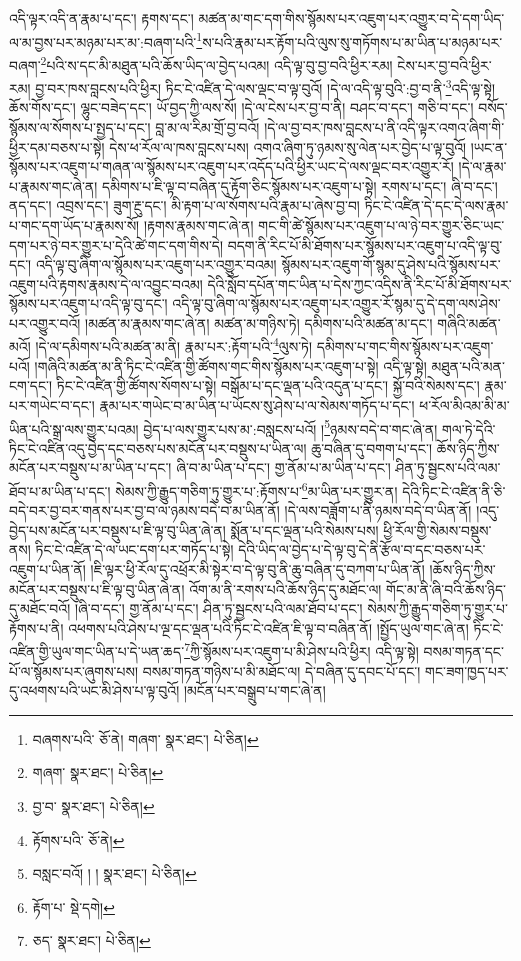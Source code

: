 འདི་ལྟར་འདི་ན་རྣམ་པ་དང་། རྟགས་དང་། མཚན་མ་གང་དག་གིས་སྙོམས་པར་འཇུག་པར་འགྱུར་བ་དེ་དག་ཡིད་ལ་མ་བྱས་པར་མཉམ་པར་མ་:བཞག་པའི་\footnote{བཞགས་པའི་  ཅོ་ནེ། གཞག་  སྣར་ཐང་།  པེ་ཅིན། }ས་པའི་རྣམ་པར་རྟོག་པའི་ལུས་སུ་གཏོགས་པ་མ་ཡིན་པ་མཉམ་པར་བཞག་\footnote{གཞག་  སྣར་ཐང་།  པེ་ཅིན། }པའི་ས་དང་མི་མཐུན་པའི་ཆོས་ཡིད་ལ་བྱེད་པའམ། འདི་ལྟ་བུ་བྱ་བའི་ཕྱིར་རམ། ངེས་པར་བྱ་བའི་ཕྱིར་རམ། བྱ་བར་ཁས་བླངས་པའི་ཕྱིར། ཏིང་ངེ་འཛིན་དེ་ལས་ལྡང་བ་ལྟ་བུའོ། །དེ་ལ་འདི་ལྟ་བུའི་:བྱ་བ་ནི་\footnote{བྱ་བ་  སྣར་ཐང་།  པེ་ཅིན། }འདི་ལྟ་སྟེ། ཆོས་གོས་དང་། ལྷུང་བཟེད་དང་། ཡོ་བྱད་ཀྱི་ལས་སོ། །དེ་ལ་ངེས་པར་བྱ་བ་ནི། བཤང་བ་དང་། གཅི་བ་དང་། བསོད་སྙོམས་ལ་སོགས་པ་སྤྱད་པ་དང་། བླ་མ་ལ་རིམ་གྲོ་བྱ་བའོ། །དེ་ལ་བྱ་བར་ཁས་བླངས་པ་ནི་འདི་ལྟར་འགའ་ཞིག་གི་ཕྱིར་དམ་བཅས་པ་སྟེ། དེས་ཕ་རོལ་ལ་ཁས་བླངས་པས། འགའ་ཞིག་ཏུ་ཉམས་སུ་ལེན་པར་བྱེད་པ་ལྟ་བུའོ། །ཡང་ན་སྙོམས་པར་འཇུག་པ་གཞན་ལ་སྙོམས་པར་འཇུག་པར་འདོད་པའི་ཕྱིར་ཡང་དེ་ལས་ལྡང་བར་འགྱུར་རོ། །དེ་ལ་རྣམ་པ་རྣམས་གང་ཞེ་ན། དམིགས་པ་ཇི་ལྟ་བ་བཞིན་དུ་རྟོག་ཅིང་སྙོམས་པར་འཇུག་པ་སྟེ། རགས་པ་དང་། ཞི་བ་དང་། ནད་དང་། འབྲས་དང་། ཟུག་རྔུ་དང་། མི་རྟག་པ་ལ་སོགས་པའི་རྣམ་པ་ཞེས་བྱ་བ། ཏིང་ངེ་འཛིན་དེ་དང་དེ་ལས་རྣམ་པ་གང་དག་ཡོད་པ་རྣམས་སོ། །རྟགས་རྣམས་གང་ཞེ་ན། གང་གི་ཚེ་སྙོམས་པར་འཇུག་པ་ལ་ཉེ་བར་གྱུར་ཅིང་ཡང་དག་པར་ཉེ་བར་གྱུར་པ་དེའི་ཚེ་གང་དག་གིས་དེ། བདག་ནི་རིང་པོ་མི་ཐོགས་པར་སྙོམས་པར་འཇུག་པ་འདི་ལྟ་བུ་དང་། འདི་ལྟ་བུ་ཞིག་ལ་སྙོམས་པར་འཇུག་པར་འགྱུར་བའམ། སྙོམས་པར་འཇུག་གོ་སྙམ་དུ་ཤེས་པའི་སྙོམས་པར་འཇུག་པའི་རྟགས་རྣམས་དེ་ལ་འབྱུང་བའམ། དེའི་སློབ་དཔོན་གང་ཡིན་པ་དེས་ཀྱང་འདིས་ནི་རིང་པོ་མི་ཐོགས་པར་སྙོམས་པར་འཇུག་པ་འདི་ལྟ་བུ་དང་། འདི་ལྟ་བུ་ཞིག་ལ་སྙོམས་པར་འཇུག་པར་འགྱུར་རོ་སྙམ་དུ་དེ་དག་ལས་ཤེས་པར་འགྱུར་བའོ། །མཚན་མ་རྣམས་གང་ཞེ་ན། མཚན་མ་གཉིས་ཏེ། དམིགས་པའི་མཚན་མ་དང་། གཞིའི་མཚན་མའོ། །དེ་ལ་དམིགས་པའི་མཚན་མ་ནི། རྣམ་པར་:རྟོག་པའི་\footnote{རྟོགས་པའི་  ཅོ་ནེ། }ལུས་ཏེ། དམིགས་པ་གང་གིས་སྙོམས་པར་འཇུག་པའོ། །གཞིའི་མཚན་མ་ནི་ཏིང་ངེ་འཛིན་གྱི་ཚོགས་གང་གིས་སྙོམས་པར་འཇུག་པ་སྟེ། འདི་ལྟ་སྟེ། མཐུན་པའི་མན་ངག་དང་། ཏིང་ངེ་འཛིན་གྱི་ཚོགས་སོགས་པ་སྟེ། བསྒོམ་པ་དང་ལྡན་པའི་འདུན་པ་དང་། སྐྱོ་བའི་སེམས་དང་། རྣམ་པར་གཡེང་བ་དང་། རྣམ་པར་གཡེང་བ་མ་ཡིན་པ་ཡོངས་སུ་ཤེས་པ་ལ་སེམས་གཏོད་པ་དང་། ཕ་རོལ་མིའམ་མི་མ་ཡིན་པའི་སྒྲ་ལས་གྱུར་པའམ། བྱེད་པ་ལས་གྱུར་པས་མ་:བསླངས་པའོ། །\footnote{བསླང་བའོ། ། །  སྣར་ཐང་།  པེ་ཅིན། }ཉམས་བདེ་བ་གང་ཞེ་ན། གལ་ཏེ་དེའི་ཏིང་ངེ་འཛིན་འདུ་བྱེད་དང་བཅས་པས་མངོན་པར་བསྡུས་པ་ཡིན་ལ། ཆུ་བཞིན་དུ་བགག་པ་དང་། ཆོས་ཉིད་ཀྱིས་མངོན་པར་བསྡུས་པ་མ་ཡིན་པ་དང་། ཞི་བ་མ་ཡིན་པ་དང་། གྱ་ནོམ་པ་མ་ཡིན་པ་དང་། ཤིན་ཏུ་སྦྱངས་པའི་ལམ་ཐོབ་པ་མ་ཡིན་པ་དང་། སེམས་ཀྱི་རྒྱུད་གཅིག་ཏུ་གྱུར་པ་:རྟོགས་པ་\footnote{རྟོག་པ་  སྡེ་དགེ། }མ་ཡིན་པར་གྱུར་ན། དེའི་ཏིང་ངེ་འཛིན་ནི་ཅི་བདེ་བར་བྱ་བར་གནས་པར་བྱ་བ་ལ་ཉམས་བདེ་བ་མ་ཡིན་ནོ། །དེ་ལས་བཟློག་པ་ནི་ཉམས་བདེ་བ་ཡིན་ནོ། །འདུ་བྱེད་པས་མངོན་པར་བསྡུས་པ་ཇི་ལྟ་བུ་ཡིན་ཞེ་ན། སྨོན་པ་དང་ལྡན་པའི་སེམས་པས། ཕྱི་རོལ་གྱི་སེམས་བསྡུས་ནས། ཏིང་ངེ་འཛིན་དེ་ལ་ཡང་དག་པར་གཏོད་པ་སྟེ། དེའི་ཡིད་ལ་བྱེད་པ་དེ་ལྟ་བུ་དེ་ནི་རྩོལ་བ་དང་བཅས་པར་འཇུག་པ་ཡིན་ནོ། །ཇི་ལྟར་ཕྱི་རོལ་དུ་འཕྲོར་མི་སྟེར་བ་དེ་ལྟ་བུ་ནི་ཆུ་བཞིན་དུ་བཀག་པ་ཡིན་ནོ། །ཆོས་ཉིད་ཀྱིས་མངོན་པར་བསྡུས་པ་ཇི་ལྟ་བུ་ཡིན་ཞེ་ན། འོག་མ་ནི་རགས་པའི་ཆོས་ཉིད་དུ་མཐོང་ལ། གོང་མ་ནི་ཞི་བའི་ཆོས་ཉིད་དུ་མཐོང་བའོ། །ཞི་བ་དང་། གྱ་ནོམ་པ་དང་། ཤིན་ཏུ་སྦྱངས་པའི་ལམ་ཐོབ་པ་དང་། སེམས་ཀྱི་རྒྱུད་གཅིག་ཏུ་གྱུར་པ་རྟོགས་པ་ནི། འཕགས་པའི་ཤེས་པ་ལྔ་དང་ལྡན་པའི་ཏིང་ངེ་འཛིན་ཇི་ལྟ་བ་བཞིན་ནོ། །སྤྱོད་ཡུལ་གང་ཞེ་ན། ཏིང་ངེ་འཛིན་གྱི་ཡུལ་གང་ཡིན་པ་དེ་ཡན་ཆད་\footnote{ཅད་  སྣར་ཐང་།  པེ་ཅིན། }ཀྱི་སྙོམས་པར་འཇུག་པ་མི་ཤེས་པའི་ཕྱིར། འདི་ལྟ་སྟེ། བསམ་གཏན་དང་པོ་ལ་སྙོམས་པར་ཞུགས་པས། བསམ་གཏན་གཉིས་པ་མི་མཐོང་ལ། དེ་བཞིན་དུ་དབང་པོ་དང་། གང་ཟག་ཁྱད་པར་དུ་འཕགས་པའི་ཡང་མི་ཤེས་པ་ལྟ་བུའོ། །མངོན་པར་བསྒྲུབ་པ་གང་ཞེ་ན། 